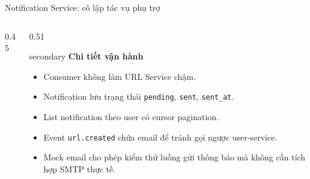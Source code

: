 \documentclass[aspectratio=169]{beamer}
\begin{document}
\begin{frame}{Notification Service: cô lập tác vụ phụ trợ}
    \begin{columns}[T,onlytextwidth]
        \begin{column}{0.45\textwidth}
        \end{column}
        \begin{column}{0.51\textwidth}
            \begin{claimbox}{secondary}
                \textbf{Chi tiết vận hành}
                \begin{itemize}\small
                    \item Consumer không làm URL Service chậm.
                    \item Notification lưu trạng thái \texttt{pending}, \texttt{sent}, \texttt{sent\_at}.
                    \item List notification theo user có cursor pagination.
                    \item Event \texttt{url.created} chứa email để tránh gọi ngược user-service.
                    \item Mock email cho phép kiểm thử luồng gửi thông báo mà không cần tích hợp SMTP thực tế.
                \end{itemize}
            \end{claimbox}
        \end{column}
    \end{columns}
\end{frame}
\end{document}
